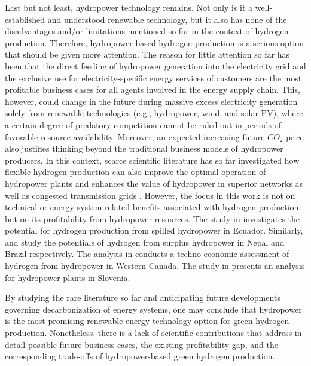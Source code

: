 \documentclass[review]{elsarticle}
\begin{document}
Last but not least, hydropower technology remains. Not only is it a well-established and understood renewable technology, but it also has none of the disadvantages and/or limitations mentioned so far in the context of hydrogen production. Therefore, hydropower-based hydrogen production is a serious option that should be given more attention. The reason for little attention so far has been that the direct feeding of hydropower generation into the electricity grid and the exclusive use for electricity-specific energy services of customers are the most profitable business cases for all agents involved in the energy supply chain. This, however, could change in the future during massive excess electricity generation solely from renewable technologies (e.g., hydropower, wind, and solar PV), where a certain degree of predatory competition cannot be ruled out in periods of favorable resource availability. Moreover, an expected increasing future $CO_2$ price also justifies thinking beyond the traditional business models of hydropower producers. In this context, scarce scientific literature has so far investigated how flexible hydrogen production can also improve the optimal operation of hydropower plants \cite{lu2015optimal} and enhances the value of hydropower in superior networks as well as congested transmission grids \cite{bodal2020value}. However, the focus in this work is not on technical or energy system-related benefits associated with hydrogen production but on its profitability from hydropower resources. The study in \cite{posso2015hydrogen} investigates the potential for hydrogen production from spilled hydropower in Ecuador. Similarly, \cite{thapa2021green} and \cite{nadaleti2020potential} study the potentials of hydrogen from surplus hydropower in Nepal and Brazil respectively. The analysis in \cite{olateju2016techno} conducts a techno-economic assessment of hydrogen from hydropower in Western Canada. The study in \cite{jovan2020can} presents an analysis for hydropower plants in Slovenia.\vspace{0.3cm}

By studying the rare literature so far and anticipating future developments governing decarbonization of energy systems, one may conclude that hydropower is the most promising renewable energy technology option for green hydrogen production. Nonetheless, there is a lack of scientific contributions that address in detail possible future business cases, the existing profitability gap, and the corresponding trade-offs of hydropower-based green hydrogen production.
\end{document}
